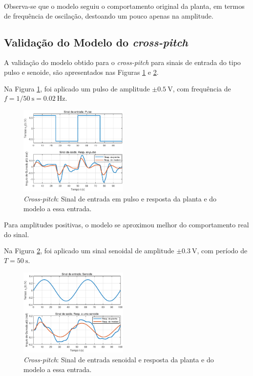 Observa-se que o modelo seguiu o comportamento original da planta, em termos de frequência de oscilação, destoando um pouco apenas na amplitude.

\subsection{\textbf{Validação do Modelo do \textit{cross-pitch}}}

A validação do modelo obtido para o \textit{cross-pitch} para sinais de entrada do tipo pulso e senoide, são apresentados nas Figuras \ref{fig:ValidaCrossPitchPulso} e \ref{fig:ValidaCrossPitchSenoide}.

Na Figura \ref{fig:ValidaCrossPitchPulso}, foi aplicado um pulso de amplitude $\pm \SI{0.5}{\volt}$, com frequência de $f = 1/\SI{50}{\s} = \SI{0.02}{\Hz}$.

\begin{figure}[H]
    \centering
    \includegraphics[width=0.48\textwidth]{figures/Validacao/ValidaCrossPitchPulso.eps}
    \caption{\textit{Cross-pitch}: Sinal de entrada em pulso e resposta da planta e do modelo a essa entrada.}
    \label{fig:ValidaCrossPitchPulso}
\end{figure}

Para amplitudes positivas, o modelo se aproximou melhor do comportamento real do sinal. 

Na Figura \ref{fig:ValidaCrossPitchSenoide}, foi aplicado um sinal senoidal de amplitude $\pm \SI{0.3}{\volt}$, com período de $T = \SI{50}{\s}$.

\begin{figure}[H]
    \centering
    \includegraphics[width=0.48\textwidth]{figures/Validacao/ValidaCrossPitchSenoide.eps}
    \caption{\textit{Cross-pitch}: Sinal de entrada senoidal e resposta da planta e do modelo a essa entrada.}
    \label{fig:ValidaCrossPitchSenoide}
\end{figure}

